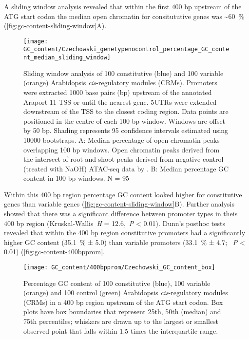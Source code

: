 \documentclass[../main.tex]{subfiles}
\begin{document}
A sliding window analysis revealed that within the first 400 bp upstream of the ATG start codon the median open chromatin for consitututive genes was \textasciitilde{}\SI{60}{\percent} (\autoref{fig:gc-content-sliding-window}A).
\begin{figure}[hbt!]
	\begin{center}
		\capstart
		\texttt{[image: GC\_content/Czechowski\_genetypenocontrol\_percentage\_GC\_content\_median\_sliding\_window]}
		\caption{
			Sliding window analysis of 100 constitutive (blue) and 100 variable (orange) Arabidopsis \textit{cis}\hyp{}regulatory modules (CRMs).
			Promoters were extracted 1000 base pairs (bp) upstream of the annotated Araport 11 \autocite{chengAraport11CompleteReannotation2017} TSS or until the nearest gene.
			5UTRs were extended downstream of the TSS to the closest coding region.
			Data points are positioned in the centre of each 100 bp window.
			Windows are offset by 50 bp.
			Shading represents 95 confidence intervals estimated using 10000 bootstraps.
			A: Median percentage of open chromatin peaks overlapping 100 bp windows. Open chromatin peaks derived from the intersect of root and shoot peaks derived from negative control (treated with NaOH) ATAC\hyp{}seq data by \textcite{potterCytokininModulatesContextdependent2018}.	
			B: Median percentage GC content in 100 bp windows. N = 95
			\label{fig:gc-content-sliding-window}
		}
	\end{center}
\end{figure}
Within this 400 bp region percentage GC content looked higher for constitutive genes than variable genes (\autoref{fig:gc-content-sliding-window}B).
Further analysis showed that there was a significant difference between promoter types in theis 400 bp region (Kruskal\hyp{}Wallis~\textit{H} = 12.6,~\textit{P} \textless{} 0.01).
Dunn's posthoc tests revealed that within the 400 bp region constitutive promoters had a significantly higher GC content (\SI{35.1}{\percent} ± 5.0) than variable promoters (\SI{33.1}{\percent} ± 4.7; ~\textit{P} \textless{} 0.01) (\autoref{fig:gc-content-400bpprom}.

\begin{figure}[hbt!]
	\begin{center}
		\capstart
		\texttt{[image: GC\_content/400bpprom/Czechowski\_GC\_content\_box]}
		\caption{
			Percentage GC content of 100 constitutive (blue), 100 variable (orange) and 100 control (green) Arabidopsis \textit{cis}\hyp{}regulatory modules (CRMs) in a 400 bp region upstream of the ATG start codon.
			Box plots have box boundaries that represent 25th, 50th (median) and 75th percentiles; whiskers are drawn up to the largest or smallest observed point that falls within 1.5 times the interquartile range.
			\label{fig:gc-content-400bpprom}
		}
	\end{center}
\end{figure}
\end{document}
